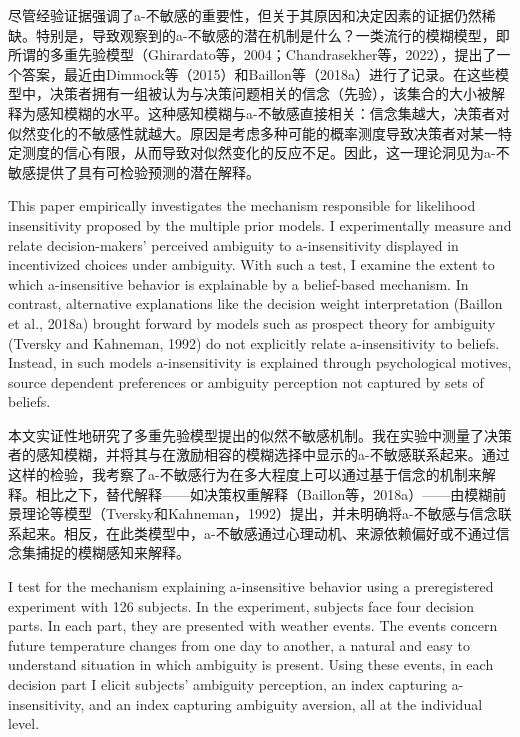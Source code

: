 \documentclass[12pt,a4paper]{article}
\newenvironment{original}
  {\par\medskip\noindent\color{black}\ignorespaces}
  {\par\medskip}
\newenvironment{translation}
  {\par\noindent\color{transblue}\ignorespaces}
  {\par\medskip\medskip}
\begin{document}
\begin{translation}
尽管经验证据强调了a-不敏感的重要性，但关于其原因和决定因素的证据仍然稀缺。特别是，导致观察到的a-不敏感的潜在机制是什么？一类流行的模糊模型，即所谓的多重先验模型（Ghirardato等，2004；Chandrasekher等，2022），提出了一个答案，最近由Dimmock等（2015）和Baillon等（2018a）进行了记录。在这些模型中，决策者拥有一组被认为与决策问题相关的信念（先验），该集合的大小被解释为感知模糊的水平。这种感知模糊与a-不敏感直接相关：信念集越大，决策者对似然变化的不敏感性就越大。原因是考虑多种可能的概率测度导致决策者对某一特定测度的信心有限，从而导致对似然变化的反应不足。因此，这一理论洞见为a-不敏感提供了具有可检验预测的潜在解释。
\end{translation}

\begin{original}
This paper empirically investigates the mechanism responsible for likelihood insensitivity proposed by the multiple prior models. I experimentally measure and relate decision-makers' perceived ambiguity to a-insensitivity displayed in incentivized choices under ambiguity. With such a test, I examine the extent to which a-insensitive behavior is explainable by a belief-based mechanism. In contrast, alternative explanations like the decision weight interpretation (Baillon et al., 2018a) brought forward by models such as prospect theory for ambiguity (Tversky and Kahneman, 1992) do not explicitly relate a-insensitivity to beliefs. Instead, in such models a-insensitivity is explained through psychological motives, source dependent preferences or ambiguity perception not captured by sets of beliefs.
\end{original}

\begin{translation}
本文实证性地研究了多重先验模型提出的似然不敏感机制。我在实验中测量了决策者的感知模糊，并将其与在激励相容的模糊选择中显示的a-不敏感联系起来。通过这样的检验，我考察了a-不敏感行为在多大程度上可以通过基于信念的机制来解释。相比之下，替代解释——如决策权重解释（Baillon等，2018a）——由模糊前景理论等模型（Tversky和Kahneman，1992）提出，并未明确将a-不敏感与信念联系起来。相反，在此类模型中，a-不敏感通过心理动机、来源依赖偏好或不通过信念集捕捉的模糊感知来解释。
\end{translation}

\begin{original}
I test for the mechanism explaining a-insensitive behavior using a preregistered experiment with 126 subjects. In the experiment, subjects face four decision parts. In each part, they are presented with weather events. The events concern future temperature changes from one day to another, a natural and easy to understand situation in which ambiguity is present. Using these events, in each decision part I elicit subjects' ambiguity perception, an index capturing a-insensitivity, and an index capturing ambiguity aversion, all at the individual level.
\end{original}
\end{document}
